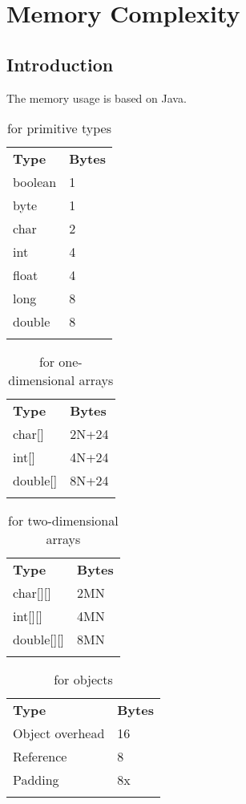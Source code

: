 \chapter{Memory Complexity}

\section{Introduction}
The memory usage is based on Java.

\begin{longtable}{ll}
\hline\noalign{\smallskip}
\textbf{Type} & \textbf{Bytes} \\
\noalign{\smallskip}\hline\noalign{\smallskip}

boolean & 1 \\
byte & 1 \\
char & 2 \\
int & 4 \\
float & 4 \\
long & 8 \\
double & 8\\

\noalign{\smallskip}\hline\noalign{\smallskip}
\caption {for primitive types}
\end{longtable}

\begin{longtable}{ll}
\hline\noalign{\smallskip}
\textbf{Type} & \textbf{Bytes} \\
\noalign{\smallskip}\hline\noalign{\smallskip}

char[] & 2N+24 \\
int[] & 4N+24 \\
double[] & 8N+24 \\

\noalign{\smallskip}\hline\noalign{\smallskip}
\caption {for one-dimensional arrays}
\end{longtable}

\begin{longtable}{ll}
\hline\noalign{\smallskip}
\textbf{Type} & \textbf{Bytes} \\
\noalign{\smallskip}\hline\noalign{\smallskip}

char[][] & 2MN \\
int[][] & 4MN \\
double[][] & 8MN \\

\noalign{\smallskip}\hline\noalign{\smallskip}
\caption {for two-dimensional arrays}
\end{longtable}

\begin{longtable}{ll}
\hline\noalign{\smallskip}
\textbf{Type} & \textbf{Bytes} \\
\noalign{\smallskip}\hline\noalign{\smallskip}

Object overhead & 16 \\
Reference & 8 \\
Padding & 8x \\

\noalign{\smallskip}\hline\noalign{\smallskip}
\caption {for objects}
\end{longtable}
